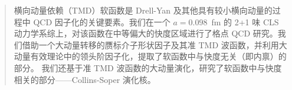\documentclass[11pt]{ctexart}
\begin{document}

\begin{abstract}
横向动量依赖（TMD）软函数是 Drell-Yan 及其他具有较小横向动量的过程中 QCD 因子化的关键要素。我们在一个 $a=0.098$~fm 的 2+1 味 CLS 动力学系综上，对该函数在中等偏大的快度区域进行了格点 QCD 研究。我们借助一个大动量转移的赝标介子形状因子及其准 TMD 波函数，并利用大动量有效理论中的领头阶因子化，提取了软函数中与快度无关（即内禀）的部分。
我们还基于准 TMD 波函数的大动量演化，研究了软函数中与快度相关的部分——Collins-Soper 演化核。
\end{abstract}







\end{document}
